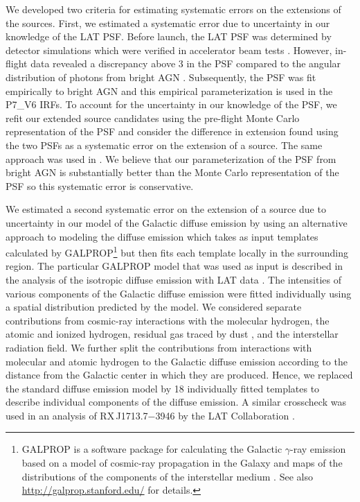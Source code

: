 We developed two criteria for estimating systematic errors on the
extensions of the sources.  First, we estimated a systematic error due
to uncertainty in our knowledge of the LAT PSF.  Before launch, the
LAT PSF was determined by detector simulations which were verified in
accelerator beam tests \citep{atwood_2009a_large-telescope}. However,
in-flight data revealed a discrepancy above 3 \gev in the PSF
compared to the angular distribution of photons from bright AGN
\citep{ackermann_2012a_fermi-large}.  Subsequently, the PSF was
fit empirically to bright AGN and this empirical parameterization
is used in the P7\_V6 IRFs.  To account for the uncertainty in our
knowledge of the PSF, we refit our extended source candidates using
the pre-flight Monte Carlo representation of the PSF and consider
the difference in extension found using the two PSFs as a systematic
error on the extension of a source.  The same approach was used
in \cite{abdo_2010a_observation-supernova}.  We believe that our
parameterization of the PSF from bright AGN is substantially better
than the Monte Carlo representation of the PSF so this systematic error
is conservative.

We estimated a second systematic error on the extension of a source
due to uncertainty in our model of the Galactic diffuse emission by
using an alternative approach to modeling the diffuse emission which
takes as input templates calculated by GALPROP\footnote{GALPROP is a
software package for calculating the Galactic $\gamma$-ray emission
based on a model of cosmic-ray propagation in the Galaxy and maps
of the distributions of the components of the interstellar medium
\citep{strong_1998a_propagation-cosmic-ray,vladimirov_2011a_galprop-webrun:}.
See also \url{http://galprop.stanford.edu/} for details.} but then fits
each template locally in the surrounding region.  The particular GALPROP
model that was used as input is described in the analysis of the isotropic
diffuse emission with LAT data \citep{abdo_2010a_spectrum-isotropic}.
The intensities of various components of the Galactic diffuse emission
were fitted individually using a spatial distribution predicted by the
model.  We considered separate contributions from cosmic-ray interactions
with the molecular hydrogen, the atomic and ionized hydrogen, residual
gas traced by dust \citep{grenier_2005a_unveiling-extensive}, and
the interstellar radiation field. We further split the contributions
from interactions with molecular and atomic hydrogen to the Galactic
diffuse emission according to the distance from the Galactic center
in which they are produced. Hence, we replaced the standard diffuse
emission model by 18 individually fitted templates to describe
individual components of the diffuse emission.  A similar crosscheck
was used in an analysis of RX\,J1713.7$-$3946 by the LAT Collaboration
\citep{abdo_2011a_observations-young}.

